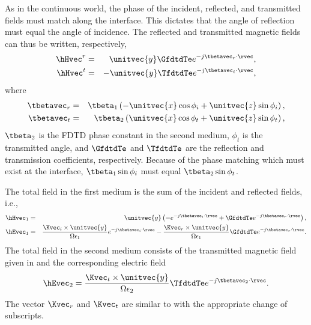 As in the continuous world, the phase of the incident, reflected, and
transmitted fields must match along the interface.  This dictates that
the angle of reflection must equal the angle of incidence.  The
reflected and transmitted magnetic fields can thus be written,
respectively,
\begin{eqnarray}
   \hHvec^r &=& \unitvec{y} \GfdtdTe e^{-j \tbetavec_r \cdot \rvec}, \\
   \hHvec^t &=& -\unitvec{y} \TfdtdTe e^{-j \tbetavec_t \cdot \rvec},
   \label{eq:hTransTeY}
\end{eqnarray}
where 
\begin{eqnarray}
  \tbetavec_r &=& \tbeta_1\left(-\unitvec{x} \cos\phi_i + 
                           \unitvec{z} \sin\phi_i\right), \\
  \tbetavec_t &=& \tbeta_2\left(\unitvec{x} \cos\phi_t + 
                          \unitvec{z} \sin\phi_t\right),
\end{eqnarray}
$\tbeta_2$ is the FDTD phase constant in the second medium, $\phi_t$
is the transmitted angle, and $\GfdtdTe$ and $\TfdtdTe$ are the
reflection and transmission coefficients, respectively.  Because of
the phase matching which must exist at the interface, $\tbeta_1
\sin\phi_i$ must equal $\tbeta_2 \sin\phi_t$.

The total field in the first medium is the sum of the incident and
reflected fields, i.e.,
\begin{eqnarray}
  \hHvec_1 &=& \unitvec{y} 
    \left( -e^{-j \tbetavec_i \cdot \rvec} 
      + \GfdtdTe e^{-j \tbetavec_r \cdot \rvec}\right), \\
  \hEvec_1 &=& 
    \frac{\Kvec_i\times\unitvec{y}}{\Omega\epsilon_1}
         e^{-j \tbetavec_i \cdot \rvec} 
    -\frac{\Kvec_r\times\unitvec{y}}{\Omega\epsilon_1}
       \GfdtdTe e^{-j \tbetavec_r \cdot \rvec}.
\end{eqnarray}
The total field in the second medium consists of the transmitted
magnetic field given in  and the corresponding
electric field
\begin{equation}
  \hEvec_2 =
    \frac{\Kvec_t\times\unitvec{y}}{\Omega\epsilon_2}
      \TfdtdTe e^{-j \tbetavec_2 \cdot \rvec}.
\end{equation}
The vector $\Kvec_r$ and $\Kvec_t$ are similar to 
with the appropriate change of subscripts.

